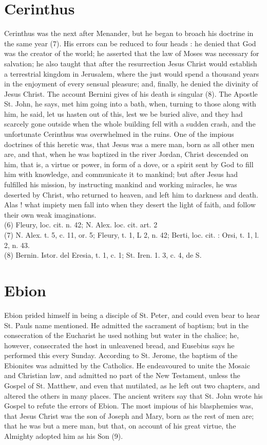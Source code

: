 \documentclass[12pt]{book}
\begin{document}
\section{Cerinthus}
Cerinthus was the next after Menander, but he began to broach his doctrine in the same year (7). His
errors can be reduced to four heads : he denied that God was the creator of the world; he asserted that the
law of Moses was necessary for salvation; he also taught that after the resurrection Jesus Christ would
establish a terrestrial kingdom in Jerusalem, where the just would spend a thousand years in the
enjoyment of every sensual pleasure; and, finally, he denied the divinity of Jesus Christ. The account
Bernini gives of his death is singular (8). The Apostle St. John, he says, met him going into a bath, when,
turning to those along with him, he said, let us hasten out of this, lest we be buried alive, and they had
scarcely gone outside when the whole building fell with a sudden crash, and the unfortunate Cerinthus
was overwhelmed in the ruins. One of the impious doctrines of this heretic was, that Jesus was a mere
man, born as all other men are, and that, when he was baptized in the river Jordan, Christ descended on
him, that is, a virtue or power, in form of a dove, or a spirit sent by God to fill him with knowledge, and
communicate it to mankind; but after Jesus had fulfilled his mission, by instructing mankind and
working miracles, he was deserted by Christ, who returned to heaven, and left him to darkness and
death. Alas ! what impiety men fall into when they desert the light of faith, and follow their own weak
imaginations.\\
(6) Fleury, loc. cit. n. 42; N. Alex. loc. cit. art. 2\\
(7) N. Alex. t. 5, c. 11, or. 5; Fleury, t. 1, L 2, n. 42; Berti, loc. cit. : Orsi, t. 1, l. 2, n. 43.\\
(8) Bernin. Istor. del Eresia, t. 1, c. 1; St. Iren. 1. 3, c. 4, de S.
\section{Ebion}
Ebion prided himself in being a disciple of St. Peter, and could even bear to hear St. Pauls name
mentioned. He admitted the sacrament of baptism; but in the consecration of the Eucharist he used
nothing but water in the chalice; he, however, consecrated the host in unleavened bread, and Eusebius
says he performed this every Sunday. According to St. Jerome, the baptism of the Ebionites was admitted
by the Catholics. He endeavoured to unite the Mosaic and Christian law, and admitted no part of the 
New Testament, unless the Gospel of St. Matthew, and even that mutilated, as he left out two chapters,
and altered the others in many places. The ancient writers say that St. John wrote his Gospel to refute the
errors of Ebion. The most impious of his blasphemies was, that Jesus Christ was the son of Joseph and
Mary, born as the rest of men are; that he was but a mere man, but that, on account of his great virtue, the
Almighty adopted him as his Son (9).
\end{document}

